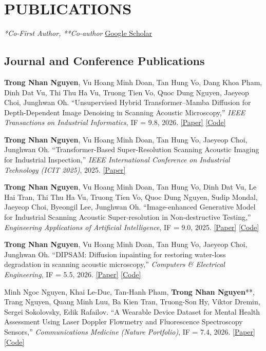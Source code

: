 \documentclass[a4paper,10pt]{extarticle}
\newcommand{\me}{\textbf{Trong Nhan Nguyen}}
\begin{document}
\section*{PUBLICATIONS}
\noindent
\textit{*Co-First Author, **Co-author}
\hfill \href{https://scholar.google.com/citations?user=3y6noxAAAAAJ\&hl=en}{Google Scholar}

\subsection*{Journal and Conference Publications}
\begin{publist}
    \item[{[J1]}] \me, Vu Hoang Minh Doan, Tan Hung Vo, Dang Khoa Pham, Dinh Dat Vu, Thi Thu Ha Vu, Truong Tien Vo, Quoc Dung Nguyen, Jaeyeop Choi, Junghwan Oh. ``Unsupervised Hybrid Transformer--Mamba Diffusion for Depth-Dependent Image Denoising in Scanning Acoustic Microscopy,'' \textit{IEEE Transactions on Industrial Informatics}, IF = 9.8, 2026. \href{https://doi.org/10.1109/TII.2025.3648838}{[Paper]} \href{https://github.com/nhannt69/SAMID}{[Code]}
    \item[{[C1]}] \me, Vu Hoang Minh Doan, Tan Hung Vo, Jaeyeop Choi, Junghwan Oh. ``Transformer-Based Super-Resolution Scanning Acoustic Imaging for Industrial Inspection,'' \textit{IEEE International Conference on Industrial Technology (ICIT 2025)}, 2025. \href{https://ieeexplore.ieee.org/document/10965207}{[Paper]}
    \item[{[J2]}] \me, Vu Hoang Minh Doan, Tan Hung Vo, Dinh Dat Vu, Le Hai Tran, Thi Thu Ha Vu, Truong Tien Vo, Quoc Dung Nguyen, Sudip Mondal, Jaeyeop Choi, Byeongil Lee, Junghwan Oh. ``Image-enhanced Generative Model for Industrial Scanning Acoustic Super-resolution in Non-destructive Testing,'' \textit{Engineering Applications of Artificial Intelligence}, IF = 9.0, 2025. \href{https://www.sciencedirect.com/science/article/pii/S095219762502531X}{[Paper]} \href{https://github.com/nhannt69/SAMGAN-Original}{[Code]}
    \item[{[J3]}] \me, Vu Hoang Minh Doan, Tan Hung Vo, Jaeyeop Choi, Junghwan Oh. ``DIPSAM: Diffusion inpainting for restoring water-loss degradation in scanning acoustic microscopy,'' \textit{Computers \& Electrical Engineering}, IF = 5.5, 2026. \href{https://www.sciencedirect.com/science/article/pii/S0045790626005677}{[Paper]} \href{https://github.com/nhannt69/dipsam}{[Code]}
    \item[{[J4]}] Minh Ngoc Nguyen, Khai Le-Duc, Tan-Hanh Pham, \me**, Trang Nguyen, Quang Minh Luu, Ba Kien Tran, Truong-Son Hy, Viktor Dremin, Sergei Sokolovsky, Edik Rafailov. ``A Wearable Device Dataset for Mental Health Assessment Using Laser Doppler Flowmetry and Fluorescence Spectroscopy Sensors,'' \textit{Communications Medicine (Nature Portfolio)}, IF = 7.4, 2026. \href{https://www.nature.com/articles/s43856-026-01766-5}{[Paper]} \href{https://github.com/leduckhai/Wearable_LDF-FS}{[Code]}

\end{publist}
\end{document}
